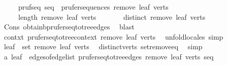 \begin{isabellebody}
\ \ \ \ \ pruf{\isacharunderscore}{\kern0pt}seq{\isacharprime}{\kern0pt}{\isacharcolon}{\kern0pt}\ {\isachardoublequoteopen}seq\ {\isasymin}\ prufer{\isacharunderscore}{\kern0pt}sequences\ {\isacharparenleft}{\kern0pt}remove{}\ leaf\ verts{\isacharparenright}{\kern0pt}{\isachardoublequoteclose}\isanewline
\ \ \ \ \ {\isachardoublequoteopen}length\ {\isacharparenleft}{\kern0pt}remove{}\ leaf\ verts{\isacharparenright}{\kern0pt}\ {\isasymge}\ {}{\isachardoublequoteclose}\isanewline
\ \ \ \ \ {\isachardoublequoteopen}distinct\ {\isacharparenleft}{\kern0pt}remove{}\ leaf\ verts{\isacharparenright}{\kern0pt}{\isachardoublequoteclose}\ \isamarkupfalse%
\ Cons\ obtain{\isacharunderscore}{\kern0pt}b{\isacharunderscore}{\kern0pt}prufer{\isacharunderscore}{\kern0pt}seq{\isacharunderscore}{\kern0pt}to{\isacharunderscore}{\kern0pt}tree{\isacharunderscore}{\kern0pt}edges\ \isamarkupfalse%
\ blast\isanewline
\ \ \isamarkupfalse%
\ \isamarkupfalse%
\ contxt{\isacharprime}{\kern0pt}{\isacharcolon}{\kern0pt}\ prufer{\isacharunderscore}{\kern0pt}seq{\isacharunderscore}{\kern0pt}to{\isacharunderscore}{\kern0pt}tree{\isacharunderscore}{\kern0pt}context\ {\isachardoublequoteopen}remove{}\ leaf\ verts{\isachardoublequoteclose}\ \isamarkupfalse%
\ {\isacharparenleft}{\kern0pt}unfold{\isacharunderscore}{\kern0pt}locales{\isacharcomma}{\kern0pt}\ simp{\isacharparenright}{\kern0pt}\isanewline
\ \ \isamarkupfalse%
\ {\isachardoublequoteopen}leaf\ {\isasymnotin}\ set\ {\isacharparenleft}{\kern0pt}remove{}\ leaf\ verts{\isacharparenright}{\kern0pt}{\isachardoublequoteclose}\ \isamarkupfalse%
\ distinct{\isacharunderscore}{\kern0pt}verts\ set{\isacharunderscore}{\kern0pt}remove{}{\isacharunderscore}{\kern0pt}eq\ \isamarkupfalse%
\ simp\isanewline
\ \ \isamarkupfalse%
\ \isamarkupfalse%
\ {\isachardoublequoteopen}{\isacharbraceleft}{\kern0pt}a{\isacharcomma}{\kern0pt}\ leaf{\isacharbraceright}{\kern0pt}\ {\isasymnotin}\ edges{\isacharunderscore}{\kern0pt}of{\isacharunderscore}{\kern0pt}edge{\isacharunderscore}{\kern0pt}list\ {\isacharparenleft}{\kern0pt}prufer{\isacharunderscore}{\kern0pt}seq{\isacharunderscore}{\kern0pt}to{\isacharunderscore}{\kern0pt}tree{\isacharunderscore}{\kern0pt}edges\ {\isacharparenleft}{\kern0pt}remove{}\ leaf\ verts{\isacharparenright}{\kern0pt}\ seq{\isacharparenright}{\kern0pt}{\isachardoublequoteclose}\isanewline

\end{isabellebody}
